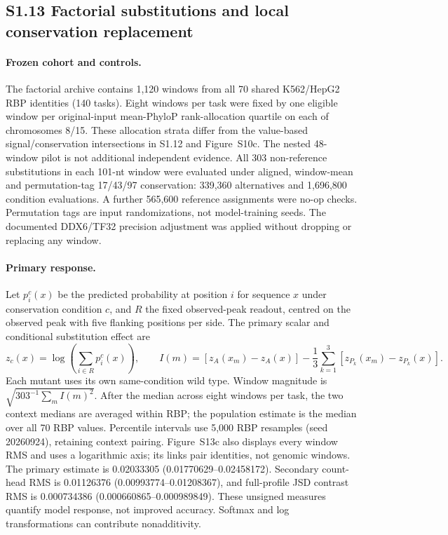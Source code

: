 \documentclass[11pt]{article}
\begin{document}
\subsection*{S1.13 Factorial substitutions and local conservation replacement}

\paragraph{Frozen cohort and controls.} The factorial archive contains 1,120 windows from all 70 shared K562/HepG2 RBP identities (140 tasks). Eight windows per task were fixed by one eligible window per original-input mean-PhyloP rank-allocation quartile on each of chromosomes 8/15. These allocation strata differ from the value-based signal/conservation intersections in S1.12 and Figure~S10c. The nested 48-window pilot is not additional independent evidence. All 303 non-reference substitutions in each 101-nt window were evaluated under aligned, window-mean and permutation-tag 17/43/97 conservation: 339,360 alternatives and 1,696,800 condition evaluations. A further 565,600 reference assignments were no-op checks. Permutation tags are input randomizations, not model-training seeds. The documented DDX6/TF32 precision adjustment was applied without dropping or replacing any window.

\paragraph{Primary response.} Let $p^c_i(x)$ be the predicted probability at position $i$ for sequence $x$ under conservation condition $c$, and $R$ the fixed observed-peak readout, centred on the observed peak with five flanking positions per side. The primary scalar and conditional substitution effect are
\[
z_c(x)=\log\!\left(\sum_{i\in R}p^c_i(x)\right),\qquad
I(m)=[z_A(x_m)-z_A(x)]-\frac{1}{3}\sum_{k=1}^{3}[z_{P_k}(x_m)-z_{P_k}(x)].
\]
Each mutant uses its own same-condition wild type. Window magnitude is $\sqrt{303^{-1}\sum_m I(m)^2}$. After the median across eight windows per task, the two context medians are averaged within RBP; the population estimate is the median over all 70 RBP values. Percentile intervals use 5,000 RBP resamples (seed 20260924), retaining context pairing. Figure~S13c also displays every window RMS and uses a logarithmic axis; its links pair identities, not genomic windows. The primary estimate is 0.02033305 (0.01770629--0.02458172). Secondary count-head RMS is 0.01126376 (0.00993774--0.01208367), and full-profile JSD contrast RMS is 0.000734386 (0.000660865--0.000989849). These unsigned measures quantify model response, not improved accuracy. Softmax and log transformations can contribute nonadditivity.
\end{document}
